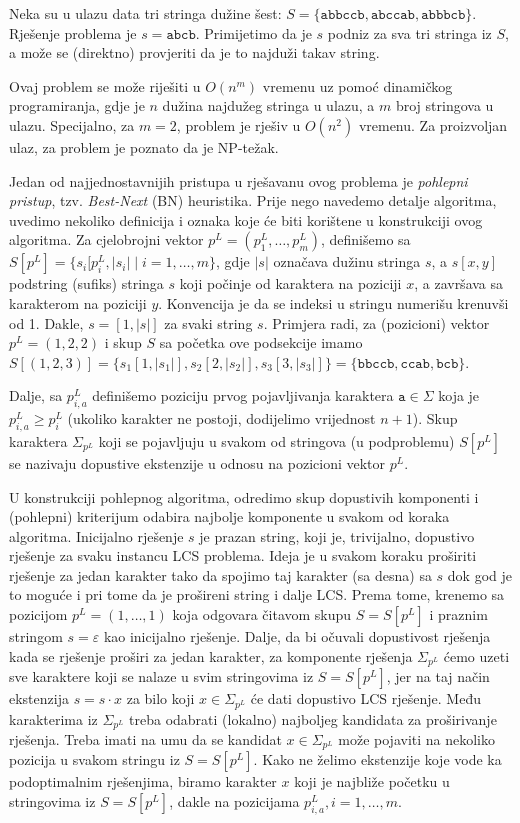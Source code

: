 \documentclass[a4paper, utf8, 11pt, colorlinks]{book}
\theoremstyle{definition}
\begin{document}
 Neka su u ulazu data tri stringa dužine šest: $S = \{  \texttt{abbccb}, \texttt{abccab}, \texttt{abbbcb}   \}$. Rješenje problema je $s=\texttt{abcb}$. Primijetimo da je $s$ podniz za sva tri stringa iz $S$, a može se (direktno) provjeriti da je to najduži takav string. 
 
 
 Ovaj problem se može riješiti u $O(n^m)$ vremenu uz pomoć dinamičkog programiranja, gdje je $n$ dužina najdužeg stringa u ulazu, a $m$ broj stringova u ulazu. Specijalno, za  $m=2$, problem je rješiv u $O(n^2)$ vremenu. Za proizvoljan ulaz, za problem je poznato da je NP-težak.  


Jedan od najjednostavnijih pristupa u rješavanu ovog problema je  \emph{pohlepni pristup}, tzv. \emph{Best-Next} (BN) heuristika. Prije nego navedemo detalje algoritma, uvedimo nekoliko definicija i oznaka koje će biti korištene u konstrukciji ovog algoritma. Za cjelobrojni vektor $p^L = (p^L_1,\ldots, p^L_m)$, definišemo sa
$S[p^L] = \{s_i[p^L_i, |s_i| \mid i=1,\ldots,m\}$, gdje $|s|$ označava dužinu stringa $s$, a $s[x,y]$ podstring (sufiks) stringa $s$ koji počinje od karaktera na poziciji $x$, a završava sa karakterom na poziciji $y$. Konvencija je da se indeksi u stringu numerišu krenuvši od 1. Dakle, $s= [1, |s|]$ za svaki string $s$. Primjera radi, za (pozicioni) vektor $p^L=(1,2,2)$ i skup $S$ sa početka ove podsekcije imamo $S[ (1,2,3)] = \{ s_1[1, |s_1|], s_2[2, |s_2|], s_3[3, |s_3|]  \}= \{ \texttt{bbccb}, \texttt{ccab}, \texttt{bcb}\}$. 
 
Dalje, sa $p^L_{i,a}$ definišemo poziciju prvog pojavljivanja karaktera $\texttt{a}\in \Sigma$ koja je  $p^L_{i,a} \geq p^L_i$ (ukoliko karakter ne postoji, dodijelimo vrijednost $n+1$). Skup karaktera $\Sigma_{p^L}$ koji se pojavljuju u svakom od stringova (u podproblemu) $S[p^L]$ se nazivaju dopustive ekstenzije u odnosu na pozicioni vektor $p^L$. 

U konstrukciji pohlepnog algoritma, odredimo  skup dopustivih komponenti i (pohlepni) kriterijum odabira najbolje komponente u svakom od koraka algoritma. Inicijalno rješenje $s$ je prazan string, koji je, trivijalno, dopustivo rješenje za svaku instancu LCS problema. Ideja je u svakom koraku proširiti rješenje za jedan karakter tako da spojimo taj karakter (sa desna) sa $s$  dok god je to moguće i pri tome da je prošireni string i dalje LCS. Prema tome, krenemo sa pozicijom $p^L = (1, \ldots, 1)$ koja odgovara čitavom skupu $S=S[p^L]$ i praznim stringom $s =\varepsilon$ kao inicijalno rješenje. Dalje, da bi očuvali dopustivost rješenja kada se rješenje proširi za jedan karakter, za komponente rješenja $\Sigma_{p^L}$ ćemo uzeti sve karaktere koji se nalaze u svim stringovima iz $S=S[p^L]$, jer na taj način  ekstenzija $s = s \cdot x$ za bilo koji $x \in \Sigma_{p^L}$ će dati dopustivo LCS rješenje. Među karakterima iz $\Sigma_{p^L}$ treba odabrati (lokalno) najboljeg kandidata za proširivanje rješenja. Treba imati na umu da se kandidat $x\in \Sigma_{p^L}$ može pojaviti na nekoliko pozicija u svakom stringu iz $S=S[p^L]$. Kako ne želimo ekstenzije koje vode ka podoptimalnim rješenjima, biramo karakter $x$ koji je najbliže početku u stringovima iz $S=S[p^L]$, dakle na pozicijama $p^L_{i,a},i=1,\ldots,m$. 
\end{document}
